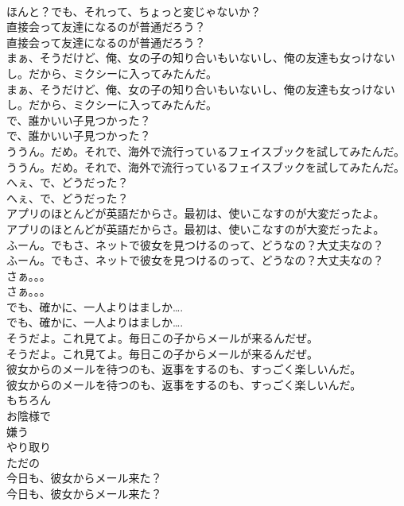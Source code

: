 \documentclass[8pt]{extreport}
\begin{document}
\begin{CJK}{UTF8}{min}
\\	ほんと？でも、それって、ちょっと変じゃないか？ 
\\	直接会って友達になるのが普通だろう？	
\\	直接会って友達になるのが普通だろう？ 
\\	まぁ、そうだけど、俺、女の子の知り合いもいないし、俺の友達も女っけないし。だから、ミクシーに入ってみたんだ。	
\\	まぁ、そうだけど、俺、女の子の知り合いもいないし、俺の友達も女っけないし。だから、ミクシーに入ってみたんだ。 
\\	で、誰かいい子見つかった？	
\\	で、誰かいい子見つかった？ 
\\	ううん。だめ。それで、海外で流行っているフェイスブックを試してみたんだ。	
\\	ううん。だめ。それで、海外で流行っているフェイスブックを試してみたんだ。 
\\	へぇ、で、どうだった？	
\\	へぇ、で、どうだった？ 
\\	アプリのほとんどが英語だからさ。最初は、使いこなすのが大変だったよ。	
\\	アプリのほとんどが英語だからさ。最初は、使いこなすのが大変だったよ。 
\\	ふーん。でもさ、ネットで彼女を見つけるのって、どうなの？大丈夫なの？	
\\	ふーん。でもさ、ネットで彼女を見つけるのって、どうなの？大丈夫なの？ 
\\	さぁ。。。	
\\	さぁ。。。 
\\	でも、確かに、一人よりはましか….	
\\	でも、確かに、一人よりはましか…. 
\\	そうだよ。これ見てよ。毎日この子からメールが来るんだぜ。	
\\	そうだよ。これ見てよ。毎日この子からメールが来るんだぜ。 
\\	彼女からのメールを待つのも、返事をするのも、すっごく楽しいんだ。	
\\	彼女からのメールを待つのも、返事をするのも、すっごく楽しいんだ。 
\\	もちろん
\\	お陰様で
\\	嫌う
\\	やり取り
\\	ただの
\\	今日も、彼女からメール来た？	
\\	今日も、彼女からメール来た？ 

\end{CJK}
\end{document}
